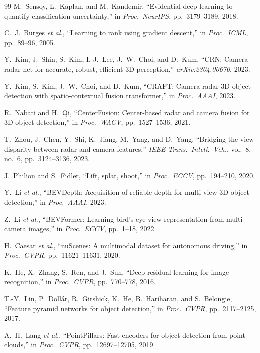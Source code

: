 \documentclass[12pt, a4paper]{article}
\theoremstyle{definition}
\begin{document}
\begin{thebibliography}{99}
M.~Sensoy, L.~Kaplan, and M.~Kandemir,
``Evidential deep learning to quantify classification uncertainty,''
in \emph{Proc.\ NeurIPS}, pp.~3179--3189, 2018.

C.~J.~Burges \emph{et al.},
``Learning to rank using gradient descent,''
in \emph{Proc.\ ICML}, pp.~89--96, 2005.

Y.~Kim, J.~Shin, S.~Kim, I.-J.~Lee, J.~W.~Choi, and D.~Kum,
``CRN: Camera radar net for accurate, robust, efficient 3D perception,''
\emph{arXiv:2304.00670}, 2023.

Y.~Kim, S.~Kim, J.~W.~Choi, and D.~Kum,
``CRAFT: Camera-radar 3D object detection with spatio-contextual fusion transformer,''
in \emph{Proc.\ AAAI}, 2023.

R.~Nabati and H.~Qi,
``CenterFusion: Center-based radar and camera fusion for 3D object detection,''
in \emph{Proc.\ WACV}, pp.~1527--1536, 2021.

T.~Zhou, J.~Chen, Y.~Shi, K.~Jiang, M.~Yang, and D.~Yang,
``Bridging the view disparity between radar and camera features,''
\emph{IEEE Trans.\ Intell.\ Veh.}, vol.~8, no.~6, pp.~3124--3136, 2023.

J.~Philion and S.~Fidler,
``Lift, splat, shoot,''
in \emph{Proc.\ ECCV}, pp.~194--210, 2020.

Y.~Li \emph{et al.},
``BEVDepth: Acquisition of reliable depth for multi-view 3D object detection,''
in \emph{Proc.\ AAAI}, 2023.

Z.~Li \emph{et al.},
``BEVFormer: Learning bird's-eye-view representation from multi-camera images,''
in \emph{Proc.\ ECCV}, pp.~1--18, 2022.

H.~Caesar \emph{et al.},
``nuScenes: A multimodal dataset for autonomous driving,''
in \emph{Proc.\ CVPR}, pp.~11621--11631, 2020.

K.~He, X.~Zhang, S.~Ren, and J.~Sun,
``Deep residual learning for image recognition,''
in \emph{Proc.\ CVPR}, pp.~770--778, 2016.

T.-Y.~Lin, P.~Doll\'{a}r, R.~Girshick, K.~He, B.~Hariharan, and S.~Belongie,
``Feature pyramid networks for object detection,''
in \emph{Proc.\ CVPR}, pp.~2117--2125, 2017.

A.~H.~Lang \emph{et al.},
``PointPillars: Fast encoders for object detection from point clouds,''
in \emph{Proc.\ CVPR}, pp.~12697--12705, 2019.


\end{thebibliography}
\end{document}
